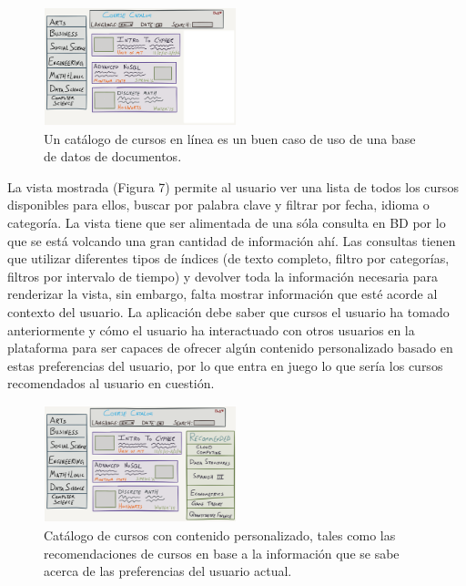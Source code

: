 \documentclass[conference]{IEEEtran}
\begin{document}
\begin{figure}[!h]
\centering
\includegraphics[width=0.5\textwidth]{6}
\caption{Un cat\'alogo de cursos en l\'inea es un buen caso de uso de una base de datos de documentos.}
\label{fig6}
\end{figure}

La vista mostrada (Figura 7) permite al usuario ver una lista de todos los cursos disponibles para ellos, buscar por palabra clave y filtrar por fecha, idioma o categor\'ia. La vista tiene que ser alimentada de una s\'ola consulta en BD por lo que se est\'a volcando una gran cantidad de informaci\'on ah\'i. Las consultas tienen que utilizar diferentes tipos de \'indices (de texto completo, filtro por categor\'ias, filtros por intervalo de tiempo) y devolver toda la informaci\'on necesaria para renderizar la vista, sin embargo, falta mostrar informaci\'on que est\'e acorde al contexto del usuario. La aplicaci\'on debe saber que cursos el usuario ha tomado anteriormente y c\'omo el usuario ha interactuado con otros usuarios en la plataforma para ser capaces de ofrecer alg\'un contenido personalizado basado en estas preferencias del usuario, por lo que entra en juego lo que ser\'ia los cursos recomendados al usuario en cuesti\'on.

\begin{figure}[!h]
\centering
\includegraphics[width=0.5\textwidth]{7}
\caption{Cat\'alogo de cursos con contenido personalizado, tales como las recomendaciones de cursos en base a la informaci\'on que se sabe acerca de las preferencias del usuario actual.}
\label{fig7}
\end{figure}
\end{document}
